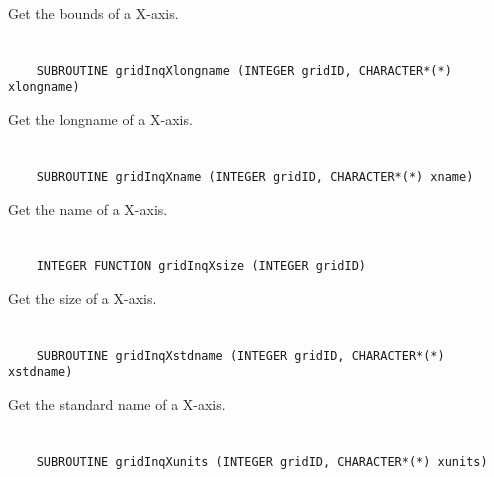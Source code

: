 Get the bounds of a X-axis.


\section*{\tt {}}

\begin{verbatim}
    SUBROUTINE gridInqXlongname (INTEGER gridID, CHARACTER*(*) xlongname)
\end{verbatim}

Get the longname of a X-axis.


\section*{\tt {}}

\begin{verbatim}
    SUBROUTINE gridInqXname (INTEGER gridID, CHARACTER*(*) xname)
\end{verbatim}

Get the name of a X-axis.


\section*{\tt {}}

\begin{verbatim}
    INTEGER FUNCTION gridInqXsize (INTEGER gridID)
\end{verbatim}

Get the size of a X-axis.


\section*{\tt {}}

\begin{verbatim}
    SUBROUTINE gridInqXstdname (INTEGER gridID, CHARACTER*(*) xstdname)
\end{verbatim}

Get the standard name of a X-axis.


\section*{\tt {}}

\begin{verbatim}
    SUBROUTINE gridInqXunits (INTEGER gridID, CHARACTER*(*) xunits)
\end{verbatim}

